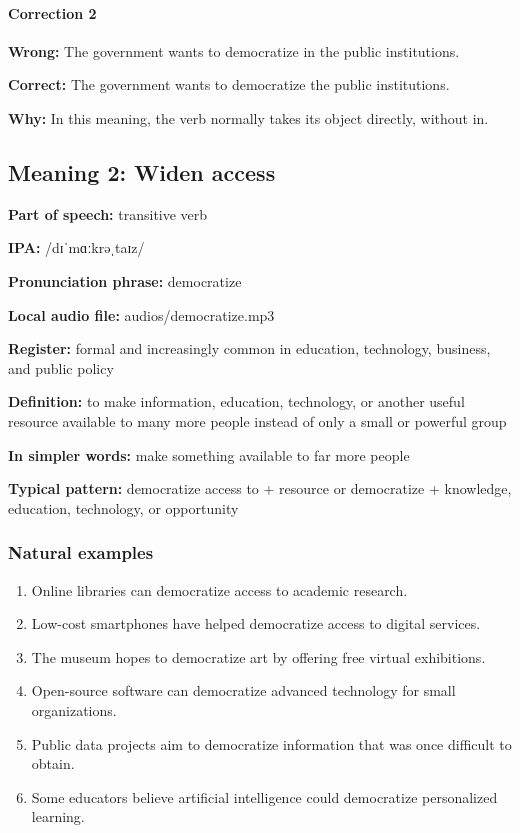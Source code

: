 \documentclass[11pt]{article}
\begin{document}
\paragraph{Correction 2}
\textbf{Wrong:} The government wants to democratize in the public institutions.

\textbf{Correct:} The government wants to democratize the public institutions.

\textbf{Why:} In this meaning, the verb normally takes its object directly, without in.

\subsection{Meaning 2: Widen access}
\textbf{Part of speech:} transitive verb

\textbf{IPA:} /dɪˈmɑːkrəˌtaɪz/

\textbf{Pronunciation phrase:} democratize

\textbf{Local audio file:} audios/democratize.mp3

\textbf{Register:} formal and increasingly common in education, technology, business, and public policy

\textbf{Definition:} to make information, education, technology, or another useful resource available to many more people instead of only a small or powerful group

\textbf{In simpler words:} make something available to far more people

\textbf{Typical pattern:} democratize access to + resource or democratize + knowledge, education, technology, or opportunity

\subsubsection{Natural examples}
\begin{enumerate}
  \item Online libraries can democratize access to academic research.
  \item Low-cost smartphones have helped democratize access to digital services.
  \item The museum hopes to democratize art by offering free virtual exhibitions.
  \item Open-source software can democratize advanced technology for small organizations.
  \item Public data projects aim to democratize information that was once difficult to obtain.
  \item Some educators believe artificial intelligence could democratize personalized learning.
\end{enumerate}
\end{document}
